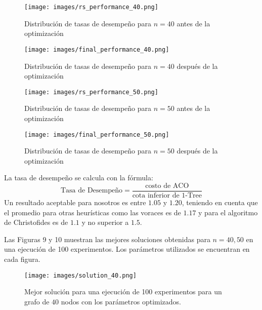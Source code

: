 \documentclass[conference]{IEEEtran}
\begin{document}
    \begin{figure}[htbp]
      \centering
      \begin{minipage}[t]{0.45\linewidth}
        \centering
        \texttt{[image: images/rs\_performance\_40.png]}
        \caption{Distribución de tasas de desempeño para $n=40$ antes de la optimización}
        \label{fig:image29}
      \end{minipage}
      \hfill
      \begin{minipage}[t]{0.45\linewidth}
        \centering
        \texttt{[image: images/final\_performance\_40.png]}
        \caption{Distribución de tasas de desempeño para $n=40$ después de la optimización}
        \label{fig:image30}
      \end{minipage}
      \begin{minipage}[t]{0.45\linewidth}
        \centering
        \texttt{[image: images/rs\_performance\_50.png]}
        \caption{Distribución de tasas de desempeño para $n=50$ antes de la optimización}
        \label{fig:image29}
      \end{minipage}
      \hfill
      \begin{minipage}[t]{0.45\linewidth}
        \centering
        \texttt{[image: images/final\_performance\_50.png]}
        \caption{Distribución de tasas de desempeño para $n=50$ después de la optimización}
        \label{fig:image30}
      \end{minipage}
    \end{figure}

La tasa de desempeño se calcula con la fórmula:
\begin{equation}
    \text{Tasa de Desempeño} = \frac{\text{costo de ACO}}{\text{cota inferior de 1-Tree}}
\end{equation}
Un resultado aceptable para nosotros es entre $1.05$ y $1.20$, teniendo en cuenta que el promedio para otras heurísticas como las voraces es de $1.17$ y para el algoritmo de Christofides es de $1.1$ y no superior a $1.5$.

Las Figuras 9 y 10 muestran las mejores soluciones obtenidas para $n=40, 50$ en una ejecución de 100 experimentos. Los parámetros utilizados se encuentran en cada figura.

\begin{figure}[htbp]
  \centering
  \texttt{[image: images/solution\_40.png]}
  \caption{Mejor solución para una ejecución de 100 experimentos para un grafo de $40$ nodos con los parámetros optimizados.}
  \label{fig:image20}
\end{figure}
\end{document}
